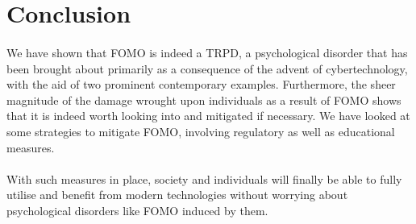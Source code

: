 \section{Conclusion}
  \paragraph{}
    We have shown that FOMO is indeed a TRPD, a psychological disorder that has been brought about primarily as a consequence of the advent of cybertechnology, with the aid of two prominent contemporary examples. Furthermore, the sheer magnitude of the damage wrought upon individuals as a result of FOMO shows that it is indeed worth looking into and mitigated if necessary. We have looked at some strategies to mitigate FOMO, involving regulatory as well as educational measures.
  \paragraph{}
    With such measures in place, society and individuals will finally be able to fully utilise and benefit from modern technologies without worrying about psychological disorders like FOMO induced by them.